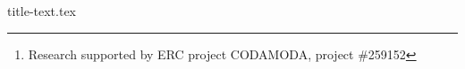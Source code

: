{title-text.tex}
\author{Andrew Miller \and
        Aggelos Kiayias \and
        Dionysis Zindros \fnmsep \thanks{Research supported by ERC project CODAMODA, project \#259152}}
\maketitle
